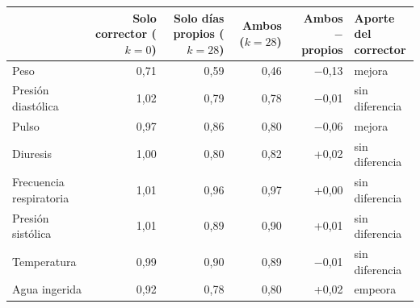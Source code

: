 \begin{tabular}{lrrrrl}\toprule
 & \makecell{Solo corrector\\($k=0$)} & \makecell{Solo días propios\\($k=28$)} & \makecell{Ambos\\($k=28$)} & \makecell{Ambos $-$\\propios} & \makecell[l]{Aporte del\\corrector} \\
\midrule
Peso & 0,71 & 0,59 & 0,46 & −0,13 & mejora \\
Presión diastólica & 1,02 & 0,79 & 0,78 & −0,01 & sin diferencia \\
Pulso & 0,97 & 0,86 & 0,80 & −0,06 & mejora \\
Diuresis & 1,00 & 0,80 & 0,82 & +0,02 & sin diferencia \\
Frecuencia respiratoria & 1,01 & 0,96 & 0,97 & +0,00 & sin diferencia \\
Presión sistólica & 1,01 & 0,89 & 0,90 & +0,01 & sin diferencia \\
Temperatura & 0,99 & 0,90 & 0,89 & −0,01 & sin diferencia \\
Agua ingerida & 0,92 & 0,78 & 0,80 & +0,02 & empeora \\
\bottomrule\end{tabular}

